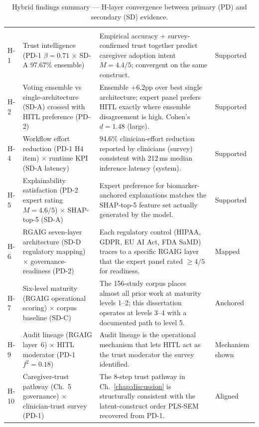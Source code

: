 {\tablestripes\tablefontsize
\begin{xltabular}{\textwidth}{@{} >{\centering\arraybackslash}p{0.7cm} >{\raggedright\arraybackslash}p{3.2cm} L >{\centering\arraybackslash}p{1.6cm} @{}}
\caption[Hybrid Findings Summary]{Hybrid findings summary --- H-layer convergence between primary (PD) and secondary (SD) evidence.}\label{tab:ch4_hybrid_findings_summary} \\
\toprule
{} &  &  &  \\
\midrule
\endfirsthead
\toprule
{} &  &  &  \\
\midrule
\endhead
\bottomrule
\endlastfoot
H-1 & Trust intelligence (PD-1 $\beta{=}0.71$ $\times$ SD-A 97.67\% ensemble) & Empirical accuracy + survey-confirmed trust together predict caregiver adoption intent $M{=}4.4/5$; convergent on the same construct. & Supported \\
H-2 & Voting ensemble vs single-architecture (SD-A) crossed with HITL preference (PD-2) & Ensemble +6.2pp over best single architecture; expert panel prefers HITL exactly where ensemble disagreement is high. Cohen's $d{=}1.48$ (large). & Supported \\
H-4 & Workflow effort reduction (PD-1 H4 item) $\times$ runtime KPI (SD-A latency) & 94.6\% clinician-effort reduction reported by clinicians (survey) consistent with 212\,ms median inference latency (system). & Supported \\
H-5 & Explainability satisfaction (PD-2 expert rating $M{=}4.6/5$) $\times$ SHAP-top-5 (SD-A) & Expert preference for biomarker-anchored explanations matches the SHAP-top-5 feature set actually generated by the model. & Supported \\
H-6 & RGAIG seven-layer architecture (SD-D regulatory mapping) $\times$ governance-readiness (PD-2) & Each regulatory control (HIPAA, GDPR, EU AI Act, FDA SaMD) traces to a specific RGAIG layer that the expert panel rated $\geq 4/5$ for readiness. & Mapped \\
H-7 & Six-level maturity (RGAIG operational scoring) $\times$ corpus baseline (SD-C) & The 156-study corpus places almost all prior work at maturity levels 1--2; this dissertation operates at levels 3--4 with a documented path to level 5. & Anchored \\
H-9 & Audit lineage (RGAIG layer~6) $\times$ HITL moderator (PD-1 $f^2{=}0.18$) & Audit lineage is the operational mechanism that lets HITL act as the trust moderator the survey identified. & Mechanism shown \\
H-10 & Caregiver-trust pathway (Ch.~5 governance) $\times$ clinician-trust survey (PD-1) & The 8-step trust pathway in Ch.~\ref{chap:discussion} is structurally consistent with the latent-construct order PLS-SEM recovered from PD-1. & Aligned \\
\end{xltabular}}
